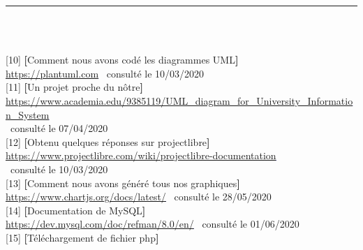 \documentclass[12pt]{report}
\begin{document}
\newpage

\def\thispagestyle#1{}
\thispagestyle{empty}
\pagestyle{empty}

\begin{center}
    {\color{Blue} \rule{5.5in}{1.4mm} }\\
    \vspace{0.1in}
    \scshape{\fontsize{34}{46}{\bfseries{\color{Blue}{Webographie}}}}
    \\
    \vspace{0.5in}
\end{center}
\renewcommand{\ULdepth}{1.8pt}

{[10]} \quad \textbf{[}Comment nous avons codé les diagrammes UML\textbf{]}\\
\hspace*{0.43in}
\textcolor{blue}{\uline{\url{https://plantuml.com}}} \, consulté le 10/03/2020
\\
{[11]} \quad \textbf{[}Un projet proche du nôtre\textbf{]}\\
\hspace*{0.43in}
\textcolor{blue}{\uline{\url{https://www.academia.edu/9385119/UML_diagram_for_University_Information_System}}}
\\
\hspace*{0.36in}
\, consulté le 07/04/2020
\\
{[12]} \quad \textbf{[}Obtenu quelques réponses sur projectlibre\textbf{]}\\
\hspace*{0.43in}
\textcolor{blue}{\uline{\url{https://www.projectlibre.com/wiki/projectlibre-documentation}}}
\\
\hspace*{0.36in}
\, consulté le 10/03/2020
\\
{[13]} \quad \textbf{[}Comment nous avons généré tous nos graphiques\textbf{]}\\
\hspace*{0.43in}
\textcolor{blue}{\uline{\url{https://www.chartjs.org/docs/latest/}}} \, consulté le 28/05/2020
\\
{[14]} \quad \textbf{[}Documentation de MySQL\textbf{]}\\
\hspace*{0.43in}
\textcolor{blue}{\uline{\url{https://dev.mysql.com/doc/refman/8.0/en/}}} \, consulté le 01/06/2020
\\
{[15]} \quad \textbf{[}Téléchargement de fichier php\textbf{]}\\
\end{document}
